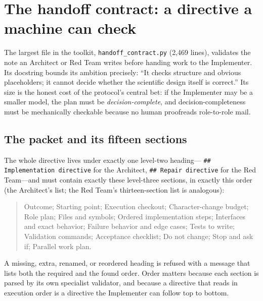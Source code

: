 \documentclass[10pt,aps,prd,twocolumn,nofootinbib]{revtex4-2}
\newcommand{\code}[1]{\texttt{#1}}
\newcommand{\file}[1]{\texttt{#1}}
\begin{document}
\section{The handoff contract: a directive a machine can check}
\label{sec:contracts}

The largest file in the toolkit, \file{handoff\_contract.py}
(2{,}469 lines), validates the note an Architect or Red Team writes
before handing work to the Implementer.  Its docstring bounds its
ambition precisely: ``It checks structure and obvious placeholders; it
cannot decide whether the scientific design itself is correct.''  Its
size is the honest cost of the protocol's central bet: if the
Implementer may be a smaller model, the plan must be
\emph{decision-complete}, and decision-completeness must be
mechanically checkable because no human proofreads role-to-role mail.

\subsection{The packet and its fifteen sections}

The whole directive lives under exactly one level-two heading---
\code{\#\# Implementation directive} for the Architect,
\code{\#\# Repair directive} for the Red Team---and must contain
exactly these level-three sections, in exactly this order (the
Architect's list; the Red Team's thirteen-section list is analogous):

\begin{quote}\small
Outcome; Starting point; Execution checkout; Character-change budget;
Role plan; Files and symbols; Ordered implementation steps; Interfaces
and exact behavior; Failure behavior and edge cases; Tests to write;
Validation commands; Acceptance checklist; Do not change; Stop and ask
if; Parallel work plan.
\end{quote}

A missing, extra, renamed, or reordered heading is refused with a
message that lists both the required and the found order.  Order
matters because each section is parsed by its own specialist
validator, and because a directive that reads in execution order is a
directive the Implementer can follow top to bottom.
\end{document}
